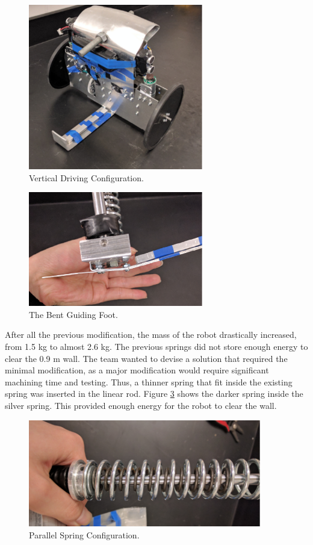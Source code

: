 \documentclass[ece]{uw-wkrpt}
\begin{document}
\begin{figure}
    \centering
    \includegraphics[width=3.0in]{res/mech9}
    \caption[Vertical Driving Configuration]
          {Vertical Driving Configuration.}
    \label{fig:mech9}
\end{figure}

\begin{figure}
    \centering
    \includegraphics[width=3.0in]{res/mech10}
    \caption[The Bent Guiding Foot]
          {The Bent Guiding Foot.}
    \label{fig:mech10}
\end{figure}

After all the previous modification, the mass of the robot drastically increased, from 1.5 kg to almost 2.6 kg. The previous springs did not store enough energy to clear the 0.9 m wall. The team wanted to devise a solution that required the minimal modification, as a major modification would require significant machining time and testing. Thus, a thinner spring that fit inside the existing spring was inserted in the linear rod. Figure \ref{fig:mech11} shows the darker spring inside the silver spring. This provided enough energy for the robot to clear the wall.

\break

\begin{figure}
    \centering
    \includegraphics[width=4in]{res/mech11}
    \caption[Parallel Spring Configuration]
          {Parallel Spring Configuration.}
    \label{fig:mech11}
\end{figure}
\end{document}

